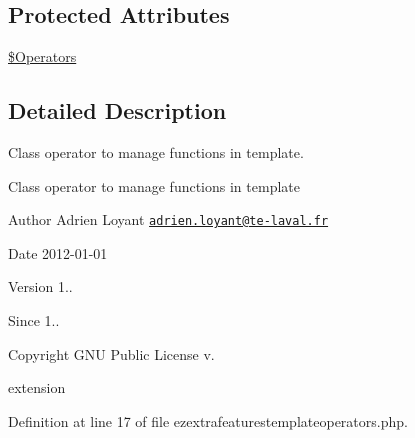 \subsection*{Protected Attributes}
\begin{DoxyCompactItemize}
\item 
\hyperlink{classextension_1_1ezextrafeatures_1_1autoloads_1_1e_z_extra_features_template_operators_ad81ef6b7a3d4066c21ba7ff179dc8757}{\$\-Operators}
\end{DoxyCompactItemize}


\subsection{Detailed Description}
Class operator to manage functions in template. 

Class operator to manage functions in template

\begin{DoxyAuthor}{Author}
Adrien Loyant \href{mailto:adrien.loyant@te-laval.fr}{\tt adrien.\-loyant@te-\/laval.\-fr}
\end{DoxyAuthor}
\begin{DoxyDate}{Date}
2012-\/01-\/01 
\end{DoxyDate}
\begin{DoxyVersion}{Version}
1.. 
\end{DoxyVersion}
\begin{DoxySince}{Since}
1.. 
\end{DoxySince}
\begin{DoxyCopyright}{Copyright}
G\-N\-U Public License v.
\end{DoxyCopyright}
extension 

Definition at line 17 of file ezextrafeaturestemplateoperators.\-php.



